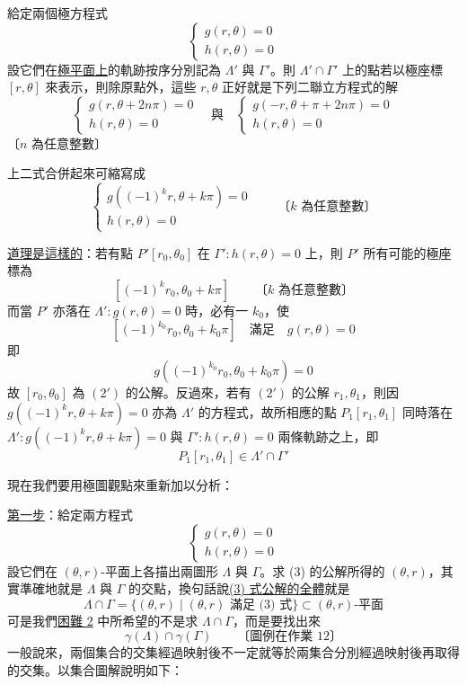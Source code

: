 給定兩個極方程式
\begin{equation}
\begin{cases}
g(r, \theta) = 0 \\[4pt]
h(r, \theta) = 0
\end{cases}
\tag{1}
\end{equation}
設它們在\underline{極平面上}的軌跡按序分別記為 $\Lambda'$ 與 $\Gamma'$。則 $\Lambda' \cap \Gamma'$ 上的點若以極座標 $[r, \theta]$ 來表示，則除原點外，這些 $r, \theta$ 正好就是下列二聯立方程式的解
\begin{equation}
\begin{cases}
g(r, \theta + 2n\pi) = 0 \\[4pt]
h(r, \theta) = 0
\end{cases}
\quad \text{與} \quad
\begin{cases}
g(-r, \theta + \pi + 2n\pi) = 0 \\[4pt]
h(r, \theta) = 0
\end{cases}
\tag{2}
\end{equation}
〔$n$ 為任意整數〕

上二式合併起來可縮寫成
\begin{equation}
\begin{cases}
g((-1)^k r, \theta + k\pi) = 0 \\[4pt]
h(r, \theta) = 0
\end{cases}
\qquad \text{〔$k$ 為任意整數〕}
\tag{$2'$}
\end{equation}

\underline{道理是這樣的}：若有點 $P'[r_0, \theta_0]$ 在 $\Gamma' : h(r, \theta) = 0$ 上，則 $P'$ 所有可能的極座標為
\[
[(-1)^k r_0, \theta_0 + k\pi] \qquad \text{〔$k$ 為任意整數〕}
\]
而當 $P'$ 亦落在 $\Lambda' : g(r, \theta) = 0$ 時，必有一 $k_0$，使
\[
[(-1)^{k_0} r_0, \theta_0 + k_0\pi] \quad \text{滿足} \quad g(r, \theta) = 0
\]
即
\[
g((-1)^{k_0} r_0, \theta_0 + k_0\pi) = 0
\]
故 $[r_0, \theta_0]$ 為 $(2')$ 的公解。反過來，若有 $(2')$ 的公解 $r_1, \theta_1$，則因 $g((-1)^k r, \theta + k\pi) = 0$ 亦為 $\Lambda'$ 的方程式，故所相應的點 $P_1[r_1, \theta_1]$ 同時落在 $\Lambda' : g((-1)^k r, \theta + k\pi) = 0$ 與 $\Gamma' : h(r, \theta) = 0$ 兩條軌跡之上，即
\[
P_1[r_1, \theta_1] \in \Lambda' \cap \Gamma' \tag*{$\#$}
\]

\medskip
現在我們要用極圖觀點來重新加以分析：

\noindent\underline{第一步}：給定兩方程式
\begin{equation}
\begin{cases}
g(r, \theta) = 0 \\[4pt]
h(r, \theta) = 0
\end{cases}
\tag{3}
\end{equation}
設它們在 $(\theta, r)$-平面上各描出兩圖形 $\Lambda$ 與 $\Gamma$。求 (3) 的公解所得的 $(\theta, r)$，其實準確地就是 $\Lambda$ 與 $\Gamma$ 的交點，換句話說\underline{(3) 式}\underline{公解的全體}就是
\[
\Lambda \cap \Gamma = \{ (\theta, r) \mid (\theta, r)\text{ 滿足 (3) 式} \} \subset (\theta, r)\text{-平面}
\]
可是我們\underline{困難 2} 中所希望的不是求 $\Lambda \cap \Gamma$，而是要找出來
\[
\gamma(\Lambda) \cap \gamma(\Gamma) \qquad \text{〔圖例在作業 12〕}
\]
一般說來，兩個集合的交集經過映射後不一定就等於兩集合分別經過映射後再取得的交集。以集合圖解說明如下：

